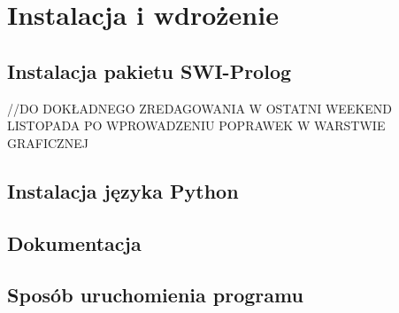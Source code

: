\chapter{Instalacja i wdrożenie}
\thispagestyle{chapterBeginStyle}

\section{Instalacja pakietu SWI-Prolog}
//DO DOKŁADNEGO ZREDAGOWANIA W OSTATNI WEEKEND LISTOPADA PO WPROWADZENIU POPRAWEK W WARSTWIE GRAFICZNEJ
\section{Instalacja języka Python}

\section{Dokumentacja}

\section{Sposób uruchomienia programu}
